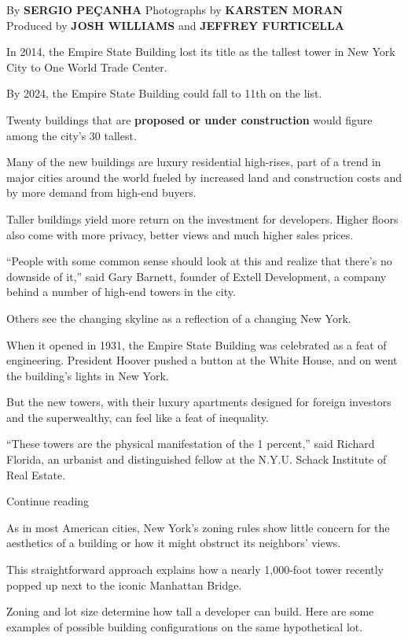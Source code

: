 By \textbf{SERGIO PEÇANHA} Photographs by \textbf{KARSTEN MORAN}\\
Produced by \textbf{JOSH WILLIAMS} and \textbf{JEFFREY FURTICELLA}
\textbar{}

In 2014, the Empire State Building lost its title as the tallest tower
in New York City to One World Trade Center.

By 2024, the Empire State Building could fall to 11th on the list.

Twenty buildings that are \textbf{proposed or under construction} would
figure among the city's 30 tallest.

Many of the new buildings are luxury residential high-rises, part of a
trend in major cities around the world fueled by increased land and
construction costs and by more demand from high-end buyers.

Taller buildings yield more return on the investment for developers.
Higher floors also come with more privacy, better views and much higher
sales prices.

``People with some common sense should look at this and realize that
there's no downside of it,'' said Gary Barnett, founder of Extell
Development, a company behind a number of high-end towers in the city.

Others see the changing skyline as a reflection of a changing New York.

When it opened in 1931, the Empire State Building was celebrated as a
feat of engineering. President Hoover pushed a button at the White
House, and on went the building's lights in New York.

But the new towers, with their luxury apartments designed for foreign
investors and the superwealthy, can feel like a feat of inequality.

``These towers are the physical manifestation of the 1 percent,'' said
Richard Florida, an urbanist and distinguished fellow at the N.Y.U.
Schack Institute of Real Estate.

Continue reading

As in most American cities, New York's zoning rules show little concern
for the aesthetics of a building or how it might obstruct its neighbors'
views.

This straightforward approach explains how a nearly 1,000-foot tower
recently popped up next to the iconic Manhattan Bridge.

Zoning and lot size determine how tall a developer can build. Here are
some examples of possible building configurations on the same
hypothetical lot.

